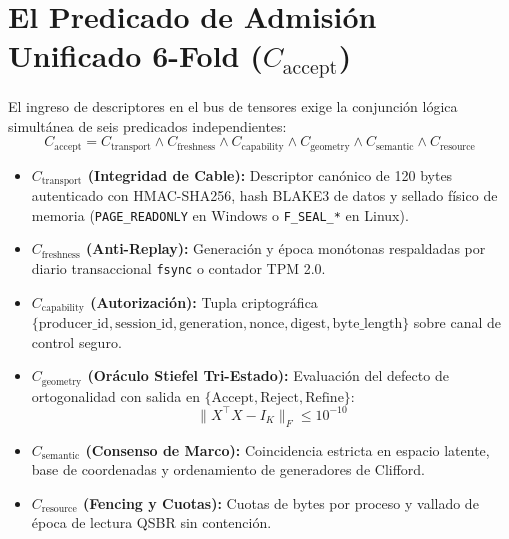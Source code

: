 \section{El Predicado de Admisión Unificado 6-Fold ($C_{\text{accept}}$)}
El ingreso de descriptores en el bus de tensores exige la conjunción lógica simultánea de seis predicados independientes:
\begin{equation}
C_{\text{accept}} = C_{\text{transport}} \land C_{\text{freshness}} \land C_{\text{capability}} \land C_{\text{geometry}} \land C_{\text{semantic}} \land C_{\text{resource}}
\end{equation}
\begin{itemize}
    \item \textbf{$C_{\text{transport}}$ (Integridad de Cable):} Descriptor canónico de 120 bytes autenticado con HMAC-SHA256, hash BLAKE3 de datos y sellado físico de memoria (\texttt{PAGE\_READONLY} en Windows o \texttt{F\_SEAL\_*} en Linux).
    \item \textbf{$C_{\text{freshness}}$ (Anti-Replay):} Generación y época monótonas respaldadas por diario transaccional \texttt{fsync} o contador TPM 2.0.
    \item \textbf{$C_{\text{capability}}$ (Autorización):} Tupla criptográfica $\{\text{producer\_id}, \text{session\_id}, \text{generation}, \text{nonce}, \text{digest}, \text{byte\_length}\}$ sobre canal de control seguro.
    \item \textbf{$C_{\text{geometry}}$ (Oráculo Stiefel Tri-Estado):} Evaluación del defecto de ortogonalidad con salida en $\{\text{Accept}, \text{Reject}, \text{Refine}\}$:
    \begin{equation}
    \|X^\top X - I_K\|_F \le 10^{-10}
    \end{equation}
    \item \textbf{$C_{\text{semantic}}$ (Consenso de Marco):} Coincidencia estricta en espacio latente, base de coordenadas y ordenamiento de generadores de Clifford.
    \item \textbf{$C_{\text{resource}}$ (Fencing y Cuotas):} Cuotas de bytes por proceso y vallado de época de lectura QSBR sin contención.
\end{itemize}

